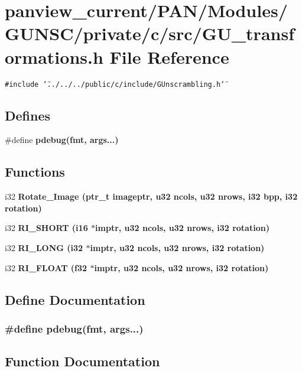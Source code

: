 \section{panview\_\-current/PAN/Modules/GUNSC/private/c/src/GU\_\-transformations.h File Reference}
\label{GU__transformations_8h}
{\tt \#include \char`\"{}../../../public/c/include/GUnscrambling.h\char`\"{}}\par
\subsection*{Defines}
\begin{CompactItemize}
\item 
\#define \bf{pdebug}(fmt, args...)
\end{CompactItemize}
\subsection*{Functions}
\begin{CompactItemize}
\item 
i32 \bf{Rotate\_\-Image} (ptr\_\-t imageptr, u32 ncols, u32 nrows, i32 bpp, i32 rotation)
\item 
i32 \bf{RI\_\-SHORT} (i16 $\ast$imptr, u32 ncols, u32 nrows, i32 rotation)
\item 
i32 \bf{RI\_\-LONG} (i32 $\ast$imptr, u32 ncols, u32 nrows, i32 rotation)
\item 
i32 \bf{RI\_\-FLOAT} (f32 $\ast$imptr, u32 ncols, u32 nrows, i32 rotation)
\end{CompactItemize}


\subsection{Define Documentation}
\subsubsection{\setlength{\rightskip}{0pt plus 5cm}\#define pdebug(fmt, args...)}\label{GU__transformations_8h_8c966da20fb8302f3c1dd18e5db6a22f}




\subsection{Function Documentation}
